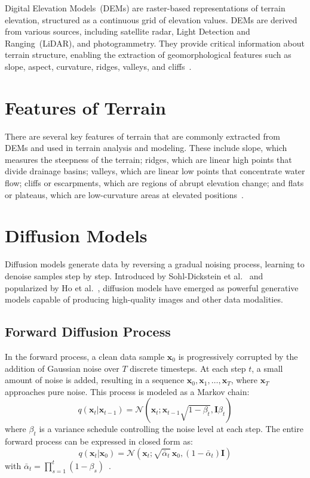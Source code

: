 Digital Elevation Models~(DEMs) are raster-based representations of terrain elevation, structured as a continuous grid of elevation values. DEMs are derived from various sources, including satellite radar, Light Detection and Ranging~(LiDAR), and photogrammetry. They provide critical information about terrain structure, enabling the extraction of geomorphological features such as slope, aspect, curvature, ridges, valleys, and cliffs~\cite{pike2008guide}.

\section{Features of Terrain}
\label{sec:terrain_features}

There are several key features of terrain that are commonly extracted from DEMs and used in terrain analysis and modeling. These include slope, which measures the steepness of the terrain; ridges, which are linear high points that divide drainage basins; valleys, which are linear low points that concentrate water flow; cliffs or escarpments, which are regions of abrupt elevation change; and flats or plateaus, which are low-curvature areas at elevated positions~\cite{pike2008guide, hengl2008geomorphometry}.

\section{Diffusion Models}
\label{sec:diffusion_models}

Diffusion models generate data by reversing a gradual noising process, learning to denoise samples step by step. Introduced by Sohl-Dickstein et al.~\cite{sohl2015deep} and popularized by Ho et al.~\cite{ho2020ddpm}, diffusion models have emerged as powerful generative models capable of producing high-quality images and other data modalities.

\subsection{Forward Diffusion Process}
\label{subsec:forward_diffusion_process}

In the forward process, a clean data sample $\mathbf{x}_0$ is progressively corrupted by the addition of Gaussian noise over $T$ discrete timesteps. At each step $t$, a small amount of noise is added, resulting in a sequence $\mathbf{x}_0, \mathbf{x}_1, \ldots, \mathbf{x}_T$, where $\mathbf{x}_T$ approaches pure noise. This process is modeled as a Markov chain:
\[
	q(\mathbf{x}_t | \mathbf{x}_{t-1}) = \mathcal{N}(\mathbf{x}_t;\mathbf{x}_{t-1} \sqrt{1 - \beta_t}, \mathbf{I} \beta_t)
\]
where $\beta_t$ is a variance schedule controlling the noise level at each step.
The entire forward process can be expressed in closed form as:
\[
	q(\mathbf{x}_t | \mathbf{x}_0) = \mathcal{N}(\mathbf{x}_t; \sqrt{\bar{\alpha}_t}\,\mathbf{x}_0, (1 - \bar{\alpha}_t)\mathbf{I})
\]
with $\bar{\alpha}_t = \prod_{s=1}^t (1 - \beta_s)$~\cite{ho2020ddpm}.


